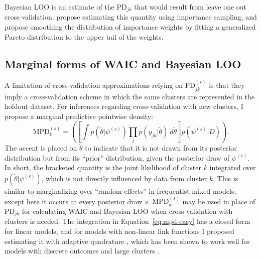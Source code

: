 \documentclass[letterpaper]{article}
\begin{document}
Bayesian LOO is an estimate of the $\mathrm{PD}_{jk}$ that would result from leave one out cross-validation.  propose estimating this quantity using importance sampling, and  propose smoothing the distribution of importance weights by fitting a generalized Pareto distribution to the upper tail of the weights.


\subsection{Marginal forms of WAIC and Bayesian LOO}

A limitation of cross-validation approximations relying on $\mathrm{PD}_{jk}^{(s)}$ is that they imply a cross-validation scheme in which the same clusters are represented in the holdout dataset. For inferences regarding cross-validation with new clusters, I propose a marginal predictive pointwise density:
\begin{equation} \label{eq:mpd-easy}
	\mathrm{MPD}_{k}^{(s)} = 
	\left (
		\left [ \int
			p(\check \theta | \psi^{(s)})
			\prod_{j} p(y_{jk} | \check \theta)
			~d \check \theta
    \right ]
		p(\psi^{(s)} | D)
	\right )
.\end{equation}
The accent is placed on $\check \theta$ to indicate that it is not 
drawn from its posterior distribution but from its ``prior'' distribution, given the posterior draw of $\psi^{(s)}$. 
In short, the bracketed quantity is the joint likelihood of cluster $k$ integrated over $p(\check \theta | \psi^{(s)})$, which is not directly influenced by data from cluster $k$.
This is similar to marginalizing over ``random effects'' in frequentist mixed models, except here it occurs at every posterior draw $s$. $\mathrm{MPD}_{k}^{(s)}$ may be used in place of $\mathrm{PD}_{jk}$ for calculating WAIC and Bayesian LOO when cross-validation with clusters is needed. The integration in Equation~\ref{eq:mpd-easy} has a closed form for linear models, and for models with non-linear link functions I proposed estimating it with adaptive quadrature \cite{naylor1982applications}, which has been shown to work well for models with discrete outcomes and large clusters \cite{rabe2005maximum}.
\end{document}
